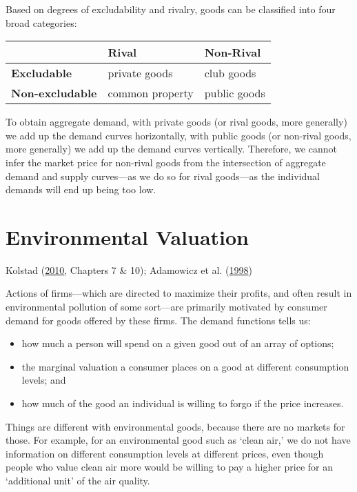 \documentclass[
]{book}
\providecommand{\tightlist}{%
  \setlength{\itemsep}{0pt}\setlength{\parskip}{0pt}}
\begin{document}
Based on degrees of excludability and rivalry, goods can be classified into four broad categories:

\begin{longtable}[]{@{}lll@{}}
\toprule
& \textbf{Rival} & \textbf{Non-Rival}\tabularnewline
\midrule
\endhead
\textbf{Excludable} & private goods & club goods\tabularnewline
\textbf{Non-excludable} & common property & public goods\tabularnewline
\bottomrule
\end{longtable}

To obtain aggregate demand, with private goods (or rival goods, more generally) we add up the demand curves horizontally, with public goods (or non-rival goods, more generally) we add up the demand curves vertically. Therefore, we cannot infer the market price for non-rival goods from the intersection of aggregate demand and supply curves---as we do so for rival goods---as the individual demands will end up being too low.

\hypertarget{environmental-valuation}{%
\chapter{Environmental Valuation}\label{environmental-valuation}}

Kolstad (\protect\hyperlink{ref-kolstad2010}{2010}, Chapters 7 \& 10); Adamowicz et al. (\protect\hyperlink{ref-adamowicz1998}{1998})

Actions of firms---which are directed to maximize their profits, and often result in environmental pollution of some sort---are primarily motivated by consumer demand for goods offered by these firms. The demand functions tells us:

\begin{itemize}
\tightlist
\item
  how much a person will spend on a given good out of an array of options;
\item
  the marginal valuation a consumer places on a good at different consumption levels; and
\item
  how much of the good an individual is willing to forgo if the price increases.
\end{itemize}

Things are different with environmental goods, because there are no markets for those. For example, for an environmental good such as `clean air,' we do not have information on different consumption levels at different prices, even though people who value clean air more would be willing to pay a higher price for an `additional unit' of the air quality.
\end{document}
